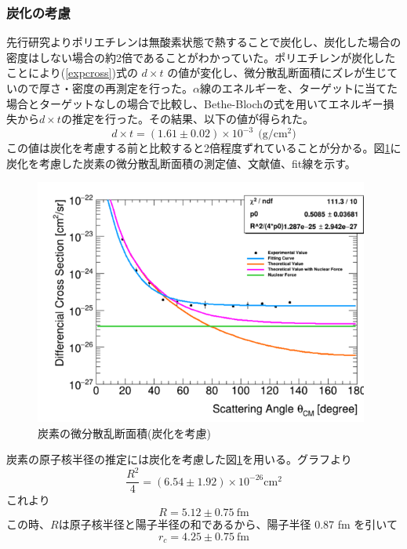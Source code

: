 \documentclass[a4paper,11pt,dvipdfmx]{jsarticle}
\begin{document}
\subsubsection{炭化の考慮}
先行研究\cite{2019}よりポリエチレンは無酸素状態で熱することで炭化し、炭化した場合の密度はしない場合の約2倍であることがわかっていた。ポリエチレンが炭化したことにより(\ref{expcross})式の $d \times t$ の値が変化し、微分散乱断面積にズレが生じていので厚さ・密度の再測定を行った。$\alpha$線のエネルギーを、ターゲットに当てた場合とターゲットなしの場合で比較し、Bethe-Blochの式を用いてエネルギー損失から$d \times t$の推定を行った。その結果、以下の値が得られた。
\begin{equation}
d\times t = (1.61\pm 0.02)\times 10^{-3} \:\: \text{(g/cm$^2$)}
\end{equation}
この値は炭化を考慮する前と比較すると2倍程度ずれていることが分かる。図\ref{tanka1}に炭化を考慮した炭素の微分散乱断面積の測定値、文献値、fit線を示す。
\begin{figure}[H]
\centering
\includegraphics[width=110mm]{picture/jan/C2.png}
\caption{炭素の微分散乱断面積(炭化を考慮)}
\label{tanka1}
\end{figure}

\label{C2}
炭素の原子核半径の推定には炭化を考慮した図\ref{tanka1}を用いる。グラフより
\begin{equation}
\frac{R^2}{4} = (6.54\pm 1.92)\times 10^{-26} \text{cm}^2
\end{equation}
これより
\begin{equation}
R = 5.12\pm 0.75\ \text{fm}
\end{equation}
この時、$R$は原子核半径と陽子半径の和であるから、陽子半径 0.87 fm を引いて
\begin{equation}
r_c = 4.25\pm 0.75\ \text{fm}
\label{tankasiki}
\end{equation}
\end{document}
